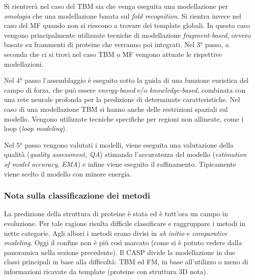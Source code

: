 {\par Si rientrerà nel caso del TBM sia che venga eseguita una modellazione per \textit{omologia} che una modellazione basata sul \textit{fold recognition}.
Si rientra invece nel caso del MF quando non si riescono a trovare dei template globali. In questo caso vengono principalmente utilizzate tecniche di modellazione \textit{fragment-based}, ovvero basate su frammenti di proteine che verranno poi integrati. Nel 3° passo, a seconda che ci si trovi nel caso TBM o MF vengono attuate le rispettive modellazioni.\\ 

\par Nel 4° passo l'assemblaggio è eseguito sotto la guida di una funzione euristica del campo di forza, che può essere \textit{energy-based} e/o \textit{knowledge-based}, combinata con una rete neurale profonda per la predizione di determinate caratteristiche. Nel caso di una modellazione TBM si hanno anche delle restrizioni spaziali sul modello. Vengono utilizzate tecniche specifiche per regioni non allineate, come i loop (\textit{loop modeling}). \\

\par Nel 5° passo vengono valutati i modelli, viene eseguita una valutazione della qualità (\textit{quality assessment, QA}) stimando l'accuratezza del modello (\textit{estimation of model accuracy}, \textit{EMA}) e infine viene eseguito il raffinamento. Tipicamente viene scelto il modello con minore energia.

\subsubsection{Nota sulla classificazione dei metodi}

La predizione della struttura di proteine è stata ed è tutt'ora un campo in evoluzione. Per tale ragione risulta difficile classificare e raggruppare i metodi in nette categorie. Agli albori i metodi erano divisi in \textit{ab initio} e \textit{comparative modeling}. Oggi il confine non è più così marcato (come si è potuto vedere dalla panoramica nella sezione precedente). Il CASP divide la modellazione in due classi principali in base alla difficoltà: TBM ed FM\supercite{kryshtafovych2021critical}, in base all'utilizzo o meno di informazioni ricavate da template (proteine con struttura 3D nota). 

}
